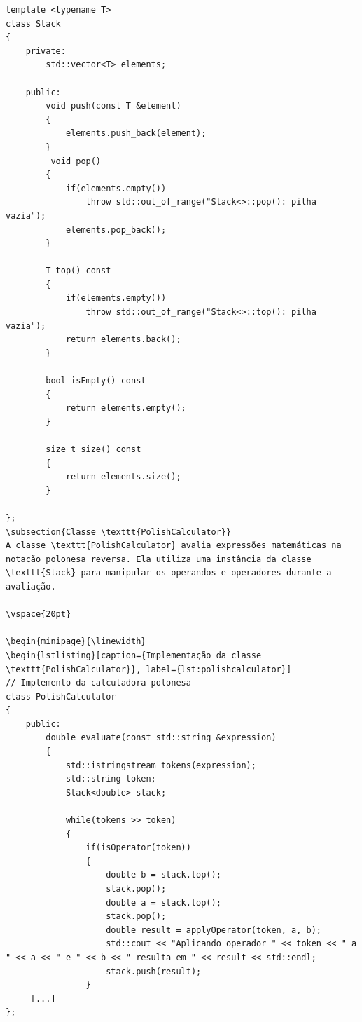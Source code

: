 \documentclass[a4paper,12pt]{article}
\begin{document}
\begin{minipage}{\linewidth}
\begin{lstlisting}[caption={Implementação da classe \texttt{Stack}}, label={lst:stack}]
template <typename T>
class Stack
{
    private:
        std::vector<T> elements;

    public:
        void push(const T &element)
        {
            elements.push_back(element);
        }
         void pop()
        {
            if(elements.empty())
                throw std::out_of_range("Stack<>::pop(): pilha vazia");
            elements.pop_back();
        }

        T top() const
        {
            if(elements.empty())
                throw std::out_of_range("Stack<>::top(): pilha vazia");
            return elements.back();
        }

        bool isEmpty() const
        {
            return elements.empty();
        }

        size_t size() const
        {
            return elements.size();
        }

};
\subsection{Classe \texttt{PolishCalculator}}
A classe \texttt{PolishCalculator} avalia expressões matemáticas na notação polonesa reversa. Ela utiliza uma instância da classe \texttt{Stack} para manipular os operandos e operadores durante a avaliação.

\vspace{20pt}

\begin{minipage}{\linewidth}
\begin{lstlisting}[caption={Implementação da classe \texttt{PolishCalculator}}, label={lst:polishcalculator}]
// Implemento da calculadora polonesa
class PolishCalculator
{
    public:
        double evaluate(const std::string &expression)
        {
            std::istringstream tokens(expression);
            std::string token;
            Stack<double> stack;

            while(tokens >> token)
            {
                if(isOperator(token))
                {
                    double b = stack.top();
                    stack.pop();
                    double a = stack.top();
                    stack.pop();
                    double result = applyOperator(token, a, b);
                    std::cout << "Aplicando operador " << token << " a " << a << " e " << b << " resulta em " << result << std::endl;
                    stack.push(result);
                }
     [...]
};
\end{lstlisting}
\end{minipage}
\end{document}
